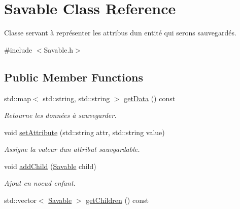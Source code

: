 \hypertarget{class_savable}{}\section{Savable Class Reference}
\label{class_savable}


Classe servant à représenter les attribus d\textquotesingle{}un entité qui serons sauvegardés.  




{\ttfamily \#include $<$Savable.\+h$>$}

\subsection*{Public Member Functions}
\begin{DoxyCompactItemize}
\item 
\hypertarget{class_savable_a3390d86dd63d09fcc78b7f1a8dfe7590}{}std\+::map$<$ std\+::string, std\+::string $>$ \hyperlink{class_savable_a3390d86dd63d09fcc78b7f1a8dfe7590}{get\+Data} () const \label{class_savable_a3390d86dd63d09fcc78b7f1a8dfe7590}

\begin{DoxyCompactList}\small\item\em Retourne les données à sauvegarder. \end{DoxyCompactList}\item 
\hypertarget{class_savable_a37c8c891c636ab68a025396d216c8a2b}{}void \hyperlink{class_savable_a37c8c891c636ab68a025396d216c8a2b}{set\+Attribute} (std\+::string attr, std\+::string value)\label{class_savable_a37c8c891c636ab68a025396d216c8a2b}

\begin{DoxyCompactList}\small\item\em Assigne la valeur d\textquotesingle{}un attribut sauvgardable. \end{DoxyCompactList}\item 
\hypertarget{class_savable_a086a5d7b7acbf5f768f14b14689d07cc}{}void \hyperlink{class_savable_a086a5d7b7acbf5f768f14b14689d07cc}{add\+Child} (\hyperlink{class_savable}{Savable} child)\label{class_savable_a086a5d7b7acbf5f768f14b14689d07cc}

\begin{DoxyCompactList}\small\item\em Ajout en noeud enfant. \end{DoxyCompactList}\item 
\hypertarget{class_savable_a98e8f61b947ba8e200a2093dffb2d69e}{}std\+::vector$<$ \hyperlink{class_savable}{Savable} $>$ \hyperlink{class_savable_a98e8f61b947ba8e200a2093dffb2d69e}{get\+Children} () const \label{class_savable_a98e8f61b947ba8e200a2093dffb2d69e}


\end{DoxyCompactItemize}
